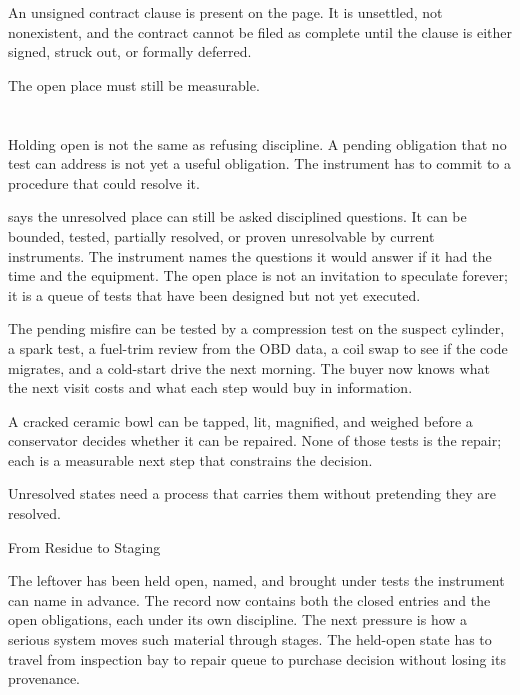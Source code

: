 An unsigned contract clause is present on the page. It is unsettled, not
nonexistent, and the contract cannot be filed as complete until the
clause is either signed, struck out, or formally deferred.

The open place must still be measurable.

\section{}
\label{se:measurable}

Holding open is not the same as refusing discipline. A pending obligation
that no test can address is not yet a useful obligation. The instrument
has to commit to a procedure that could resolve it.

 says the unresolved place can still be asked
disciplined questions. It can be bounded, tested, partially resolved, or
proven unresolvable by current instruments. The instrument names the
questions it would answer if it had the time and the equipment. The open
place is not an invitation to speculate forever; it is a queue of tests
that have been designed but not yet executed.

The pending misfire can be tested by a compression test on the suspect
cylinder, a spark test, a fuel-trim review from the OBD data, a coil
swap to see if the code migrates, and a cold-start drive the next
morning. The buyer now knows what the next visit costs and what each
step would buy in information.

A cracked ceramic bowl can be tapped, lit, magnified, and weighed before
a conservator decides whether it can be repaired. None of those tests is
the repair; each is a measurable next step that constrains the decision.

Unresolved states need a process that carries them without pretending
they are resolved.

\begin{movement}{From Residue to Staging}

The leftover has been held open, named, and brought under tests the
instrument can name in advance. The record now contains both the closed
entries and the open obligations, each under its own discipline. The
next pressure is how a serious system moves such material through
stages. The held-open state has to travel from inspection bay to repair
queue to purchase decision without losing its provenance.

\end{movement}

